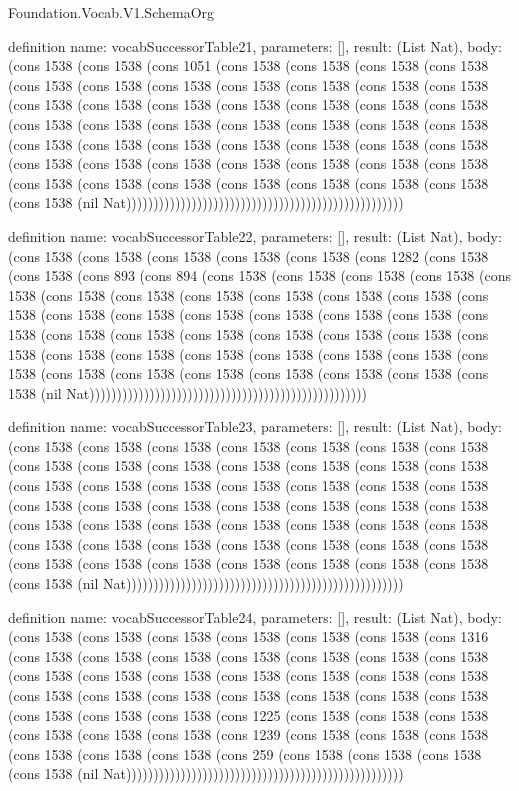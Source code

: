 \begin{lexlean}{Foundation.Vocab.V1.SchemaOrg}
\begin{semanticmodule}
definition{
  name: vocabSuccessorTable21,
  parameters: [],
  result: (List Nat),
  body: (cons 1538 (cons 1538 (cons 1051 (cons 1538 (cons 1538 (cons 1538 (cons 1538 (cons 1538 (cons 1538 (cons 1538 (cons 1538 (cons 1538 (cons 1538 (cons 1538 (cons 1538 (cons 1538 (cons 1538 (cons 1538 (cons 1538 (cons 1538 (cons 1538 (cons 1538 (cons 1538 (cons 1538 (cons 1538 (cons 1538 (cons 1538 (cons 1538 (cons 1538 (cons 1538 (cons 1538 (cons 1538 (cons 1538 (cons 1538 (cons 1538 (cons 1538 (cons 1538 (cons 1538 (cons 1538 (cons 1538 (cons 1538 (cons 1538 (cons 1538 (cons 1538 (cons 1538 (cons 1538 (cons 1538 (cons 1538 (cons 1538 (cons 1538 (nil Nat)))))))))))))))))))))))))))))))))))))))))))))))))))
}

definition{
  name: vocabSuccessorTable22,
  parameters: [],
  result: (List Nat),
  body: (cons 1538 (cons 1538 (cons 1538 (cons 1538 (cons 1538 (cons 1282 (cons 1538 (cons 1538 (cons 893 (cons 894 (cons 1538 (cons 1538 (cons 1538 (cons 1538 (cons 1538 (cons 1538 (cons 1538 (cons 1538 (cons 1538 (cons 1538 (cons 1538 (cons 1538 (cons 1538 (cons 1538 (cons 1538 (cons 1538 (cons 1538 (cons 1538 (cons 1538 (cons 1538 (cons 1538 (cons 1538 (cons 1538 (cons 1538 (cons 1538 (cons 1538 (cons 1538 (cons 1538 (cons 1538 (cons 1538 (cons 1538 (cons 1538 (cons 1538 (cons 1538 (cons 1538 (cons 1538 (cons 1538 (cons 1538 (cons 1538 (cons 1538 (nil Nat)))))))))))))))))))))))))))))))))))))))))))))))))))
}

definition{
  name: vocabSuccessorTable23,
  parameters: [],
  result: (List Nat),
  body: (cons 1538 (cons 1538 (cons 1538 (cons 1538 (cons 1538 (cons 1538 (cons 1538 (cons 1538 (cons 1538 (cons 1538 (cons 1538 (cons 1538 (cons 1538 (cons 1538 (cons 1538 (cons 1538 (cons 1538 (cons 1538 (cons 1538 (cons 1538 (cons 1538 (cons 1538 (cons 1538 (cons 1538 (cons 1538 (cons 1538 (cons 1538 (cons 1538 (cons 1538 (cons 1538 (cons 1538 (cons 1538 (cons 1538 (cons 1538 (cons 1538 (cons 1538 (cons 1538 (cons 1538 (cons 1538 (cons 1538 (cons 1538 (cons 1538 (cons 1538 (cons 1538 (cons 1538 (cons 1538 (cons 1538 (cons 1538 (cons 1538 (cons 1538 (nil Nat)))))))))))))))))))))))))))))))))))))))))))))))))))
}

definition{
  name: vocabSuccessorTable24,
  parameters: [],
  result: (List Nat),
  body: (cons 1538 (cons 1538 (cons 1538 (cons 1538 (cons 1538 (cons 1538 (cons 1316 (cons 1538 (cons 1538 (cons 1538 (cons 1538 (cons 1538 (cons 1538 (cons 1538 (cons 1538 (cons 1538 (cons 1538 (cons 1538 (cons 1538 (cons 1538 (cons 1538 (cons 1538 (cons 1538 (cons 1538 (cons 1538 (cons 1538 (cons 1538 (cons 1538 (cons 1538 (cons 1538 (cons 1538 (cons 1225 (cons 1538 (cons 1538 (cons 1538 (cons 1538 (cons 1538 (cons 1538 (cons 1239 (cons 1538 (cons 1538 (cons 1538 (cons 1538 (cons 1538 (cons 1538 (cons 259 (cons 1538 (cons 1538 (cons 1538 (cons 1538 (nil Nat)))))))))))))))))))))))))))))))))))))))))))))))))))
}


\end{semanticmodule}
\end{lexlean}
